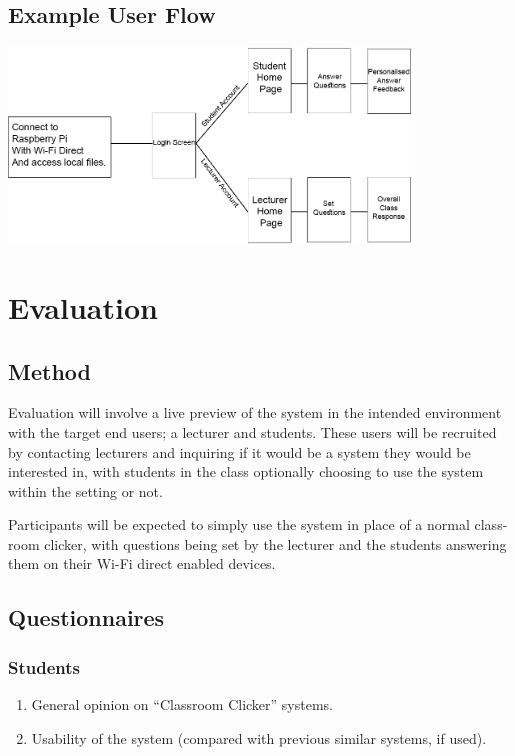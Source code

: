 \documentclass{article}
\begin{document}
\subsection{Example User Flow}
\begin{center}
    \center\includegraphics[width=0.8\textwidth]{userflow.png}
\end{center}

\section{Evaluation}
\subsection{Method}
Evaluation will involve a live preview of the system in the intended environment with the target end users; a lecturer and students. These users will be recruited by contacting lecturers and inquiring if it would be a system they would be interested in, with students in the class optionally choosing to use the system within the setting or not.

Participants will be expected to simply use the system in place of a normal class-room clicker, with questions being set by the lecturer and the students answering them on their Wi-Fi direct enabled devices. 

\subsection{Questionnaires}
\subsubsection{Students}
\begin{enumerate}
	\item General opinion on ``Classroom Clicker'' systems.
	\item Usability of the system (compared with previous similar systems, if used).
\end{enumerate}
\end{document}
